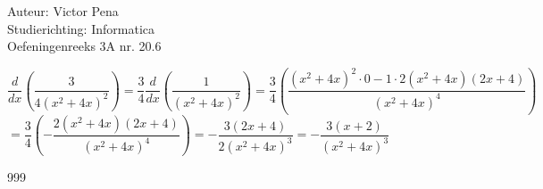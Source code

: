\documentclass[a4paper]{article}
\begin{document}
	
	\noindent \large Auteur: Victor Pena \\
	\noindent \large Studierichting: Informatica\\
	\noindent \large Oefeningenreeks 3A nr. 20.6\\
	
	\medskip
	
	\normalsize 
	
	$\dfrac{d}{dx}\left(\dfrac{3}{4(x^2+4x)^2}\right)= \dfrac{3}{4}\dfrac{d}{dx}\left(\dfrac{1}{(x^2+4x)^2}\right) = \dfrac{3}{4}\left(\dfrac{(x^2+4x)^2\cdot0 - 1\cdot2(x^2+4x)(2x+4)}{(x^2+4x)^4}\right)$ \\
	
	$=\dfrac{3}{4}\left(-\dfrac{2(x^2+4x)(2x+4)}{(x^2+4x)^4}\right)=-\dfrac{3(2x+4)}{2(x^2+4x)^3} = -\dfrac{3(x+2)}{(x^2+4x)^3}$
	
	
	\begin{thebibliography}{999}
	\end{thebibliography}
\end{document}
